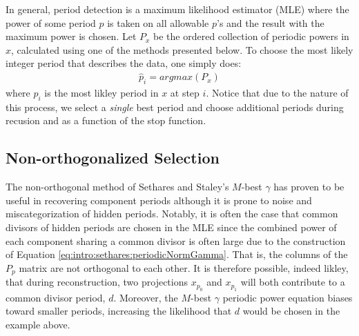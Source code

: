 In general, period detection is a maximum likelihood estimator (MLE) where the power of some period $p$ is taken on all allowable $p$'s and the result with the maximum power is chosen. Let $P_x$ be the ordered collection of periodic powers in $x$, calculated using one of the methods presented below. To choose the most likely integer period that describes the data, one simply does:
\begin{align}
    \hat{p}_{i} = argmax(P_x)
\end{align}
where $\hat{p}_{i}$ is the most likley period in $x$ at step $i$. Notice that due to the nature of this process, we select a \emph{single} best period and choose additional periods during recusion and as a function of the stop function.

    \subsection{Non-orthogonalized Selection}
    The non-orthogonal method of Sethares and Staley's $M$-best $\gamma$ has proven to be useful in recovering component periods although it is prone to noise and miscategorization of hidden periods. Notably, it is often the case that common divisors of hidden periods are chosen in the MLE since the combined power of each component sharing a common divisor is often large due to the construction of Equation \eqref{eq:intro:sethares:periodicNormGamma}. That is, the columns of the $P_p$ matrix are not orthogonal to each other. It is therefore possible, indeed likley, that during reconstruction, two projections $x_{p_0}$ and $x_{p_1}$ will both contribute to a common divisor period, $d$. Moreover, the $M$-best $\gamma$ periodic power equation biases toward smaller periods, increasing the likelihood that $d$ would be chosen in the example above.

